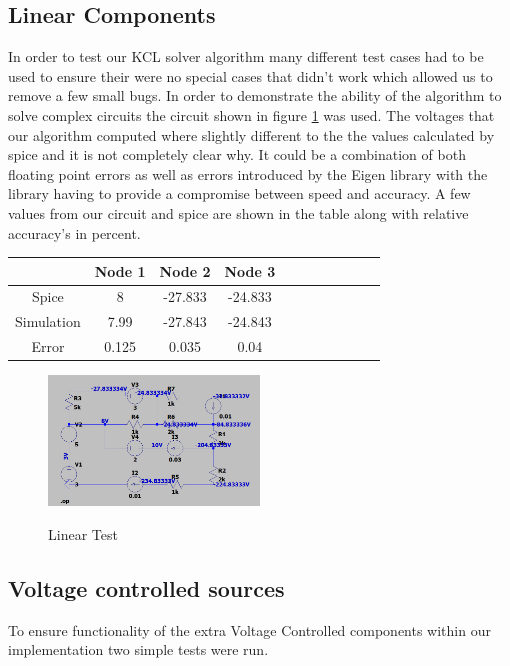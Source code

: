 \documentclass{article}
\begin{document}
\subsection{Linear Components}
In order to test our KCL solver algorithm many different test cases had to be used to ensure their were no special cases that didn't work which allowed us to remove a few small bugs. In order to demonstrate the ability of the algorithm to solve complex circuits the circuit shown in figure \ref{fig:LinearTest} was used. The voltages that our algorithm computed where slightly different to the the values calculated by spice and it is not completely clear why. It could be a combination of both floating point errors as well as errors introduced by the Eigen library with the library having to provide a compromise between speed and accuracy. A few values from our circuit and spice are shown in the table along with relative accuracy's in percent. 
\begin{center}
\begin{tabular}{ ||c|| c |c | c | c | c | c | c | c | c | c ||}
 \hline
  & Node 1 & Node 2 & Node 3\\  
  \hline
 Spice & 8 & -27.833 & -24.833\\   
 Simulation & 7.99 & -27.843 & -24.843\\
 Error & 0.125 & 0.035 & 0.04\\ 
 \hline
\end{tabular}
\end{center}
\begin{figure}[h]
    \caption{Linear Test}
    \centering
    \includegraphics[width=0.5\textwidth]{images/LinearTest.png}
    \label{fig:LinearTest}
\end{figure}

\subsection{Voltage controlled sources}
To ensure functionality of the extra Voltage Controlled components within our implementation two simple tests were run.
\end{document}
